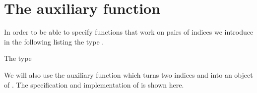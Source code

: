 
\section{The auxiliary function \makepair}
\label{sec:makepair}

In order to be able to specify functions that work
on pairs of indices we introduce in the following listing
the type \sizetypepair.

\begin{listing}[hbt]
\begin{minipage}{0.99\textwidth}

\end{minipage}
  \caption{The type \sizetypepair}
\end{listing}



We will also use the auxiliary function \makepair which turns
two indices  and  into an object of \sizetypepair.
The specification and implementation of  is shown here.



\clearpage

